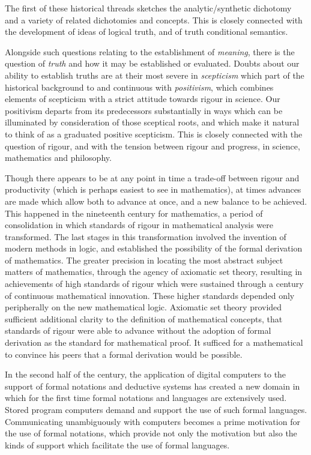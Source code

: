The first of these historical threads sketches the analytic/synthetic
dichotomy and a variety of related dichotomies and concepts.
This is closely connected with the development of ideas of logical
truth, and of truth conditional semantics.

Alongside such questions relating to the establishment of
\emph{meaning}, there is the question of \emph{truth} and how it may
be established or evaluated.
Doubts about our ability to establish truths are at their most severe
in \emph{scepticism} which part of the historical background to and
continuous with \emph{positivism}, which combines elements of
scepticism with a strict attitude towards rigour in science.
Our positivism departs from its predecessors substantially in ways
which can be illuminated by consideration of those sceptical roots,
and which make it natural to think of as a graduated positive
scepticism.
This is closely connected with the question of rigour, and with the
tension between rigour and progress, in science, mathematics and
philosophy.

Though there appears to be at any point in time a trade-off between
rigour and productivity (which is perhaps easiest to see in
mathematics), at times advances are made which allow both to advance
at once, and a new balance to be achieved.
This happened in the nineteenth century for mathematics, a period of
consolidation in which standards of rigour in mathematical analysis
were transformed.
The last stages in this transformation involved the invention of
modern methods in logic, and established the possibility of the formal
derivation of mathematics.
The greater precision in locating the most abstract subject matters of
mathematics, through the agency of axiomatic set theory, resulting in
achievements of high standards of rigour which were sustained through
a century of continuous mathematical innovation.
These higher standards depended only peripherally on the new
mathematical logic.
Axiomatic set theory provided sufficient additional clarity to the
definition of mathematical concepts, that standards of rigour were
able to advance without the adoption of formal derivation as the
standard for mathematical proof.
It sufficed for a mathematical to convince his peers that a formal
derivation would be possible.

In the second half of the century, the application of digital
computers to the support of formal notations and deductive systems has
created a new domain in which for the first time formal notations and
languages are extensively used.
Stored program computers demand and support the use of such formal
languages.
Communicating unambiguously with computers becomes a prime motivation
for the use of formal notations, which provide not only the motivation
but also the kinds of support which facilitate the use of formal languages.

